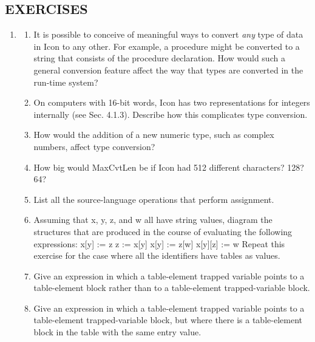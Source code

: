 \subsection[EXERCISES]{EXERCISES}
\liststyleLxviii
\begin{enumerate}
\item \begin{enumerate}

\item It is possible to conceive of meaningful ways to convert
\textit{any} type of data in Icon to any other. For example, a
procedure might be converted to a string that consists of the
procedure declaration. How would such a general conversion feature
affect the way that types are converted in the run-time system?

\item On computers with 16-bit words, Icon has two representations for
integers internally (see Sec. 4.1.3). Describe how this complicates
type conversion.

\item How would the addition of a new numeric type, such as complex
numbers, affect type conversion?

\item How big would MaxCvtLen be if Icon had 512 different characters?
128? 64?

\item List all the source-language operations that perform assignment.

\item Assuming that x, y, z, and w all have string values, diagram the
structures that are produced in the course of evaluating the following
expressions:\newline
x[y] := z\newline
z := x[y]\newline
x[y] := z[w]\newline
x[y][z] := w\newline
Repeat this exercise for the case where all the identifiers have tables as values.

\item Give an expression in which a table-element trapped variable
points to a table-element block rather than to a table-element
trapped-variable block.

\item Give an expression in which a table-element trapped variable
points to a table-element trapped-variable block, but where there is a
table-element block in the table with the same entry value.


\end{enumerate}
\end{enumerate}
